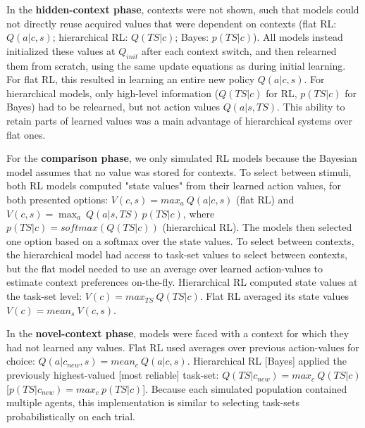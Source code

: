 \documentclass[10pt,letterpaper]{article}  %
\begin{document}
In the \textbf{hidden-context phase}, contexts were not shown, such that models could not directly reuse acquired values that were dependent on contexts (flat RL: $Q(a|c,s)$; hierarchical RL: $Q(TS|c)$; Bayes: $p(TS|c)$). All models instead initialized these values at $Q_{init}$ after each context switch, and then relearned them from scratch, using the same update equations as during initial learning.
For flat RL, this resulted in learning an entire new policy $Q(a|c,s)$. For hierarchical models, only high-level information ($Q(TS|c)$ for RL, $p(TS|c)$ for Bayes) had to be relearned, but not action values $Q(a|s,TS)$.
This ability to retain parts of learned values was a main advantage of hierarchical systems over flat ones.

For the \textbf{comparison phase}, we only simulated RL models because the Bayesian model assumes that no value was stored for contexts.
To select between stimuli, both RL models computed "state values" \cite{sutton_reinforcement_2017} from their learned action values, for both presented options: $V(c,s) = max_a \ Q(a|c,s)$ (flat RL) and $V(c,s) = \max_a \ Q(a|s,TS) \ p(TS|c)$, where $p(TS|c) = softmax(Q(TS|c))$ (hierarchical RL). The models then selected one option based on a softmax over the state values. 
To select between contexts, the hierarchical model had access to task-set values to select between contexts, but the flat model needed to use an average over learned action-values to estimate context preferences on-the-fly. Hierarchical RL computed state values at the task-set level: $V(c) = max_{TS} \ Q(TS|c)$. Flat RL averaged its state values $V(c) = mean_s \ V(c,s)$.

In the \textbf{novel-context phase}, models were faced with a context for which they had not learned any values. %
Flat RL used averages over previous action-values for choice: $Q(a|c_{new},s) = mean_c \ Q(a|c,s)$.
Hierarchical RL [Bayes] applied the previously highest-valued [most reliable] task-set: $Q(TS|c_{new}) = max_c \ Q(TS|c)$ [$p(TS|c_{new}) = max_c \ p(TS|c)$]. Because each simulated population contained multiple agents, this implementation is similar to selecting task-sets probabilistically on each trial.
\end{document}
